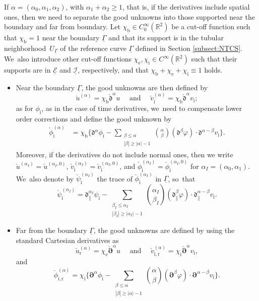 \documentclass[10pt]{amsart}
\newcommand{\R}{{\mathbb R}}
\newcommand{\cI}{{\mathcal I}}
\newcommand{\cE}{{\mathcal E}}
\newcommand{\ul}[1]{\underline{#1}}
\newcommand{\itGamma}{\mathit{\Gamma}}
\newcommand{\cpalpha}{\check{\bm{\partial}}^{\alpha} }
\newcommand{\cmfalpha}{\check{\mathfrak{d}}^{\alpha}}
\theoremstyle{definition}
\begin{document}
If $\alpha=(\alpha_0,\alpha_1,\alpha_2)$, with $\alpha_1+\alpha_2\geq 1$, that is, if the derivatives include spatial ones,
then we need to separate the good unknowns into those supported near the boundary and far from boundary.
Let $\chi_\mathrm{b}\in C_0^\infty(\R^2)$ be a cut-off function such that $\chi_\mathrm{b}=1$ near the boundary $\ul{\itGamma}$ and that its support is in the
tubular neighborhood~$U_{\ul{\itGamma}}$ of the reference curve $\ul{\itGamma}$ defined in Section \ref{subsect:NTCS}. We~also introduce other cut-off functions $\chi_\mathrm{e},\chi_\mathrm{i}\in C^\infty(\R^2)$ such that their supports are in $\ul{\cE}$ and $\ul{\cI}$, respectively,
and that $\chi_\mathrm{b}+\chi_\mathrm{e}+\chi_\mathrm{i}\equiv1$ holds.
\begin{itemize}
\item
Near the boundary $\ul{\itGamma}$, the good unknowns are then defined by
\[
\check{u}^{(\alpha)} = \chi_\mathrm{b} \cmfalpha u
\quad\mbox{ and }\quad
\check{v}_\mathrm{i}^{(\alpha)} = \chi_\mathrm{b} \cmfalpha v_\mathrm{i};
\]
as for $\phi_\mathrm{i}$, as in the case of time derivatives, we~need to compensate lower order corrections and define the good unknown by
\begin{align*}
\check{\phi}_\mathrm{i}^{(\alpha)}
&= \chi_\mathrm{b} \biggl\{ \mathfrak{d}^{\alpha}\phi_\mathrm{i} - \sum_{\substack{\beta\leq\alpha\\ |\beta|\geq|\alpha|-1}} \binom{\alpha}{\beta}
(\mathfrak{d}^{\beta}\varphi)\cdot \mathfrak{d}^{\alpha-\beta}v_\mathrm{i} \biggr\}.
\end{align*}
Moreover, if the derivatives do not include normal ones, then we write $\check{u}^{(\alpha_I)}=\check{u}^{(\alpha_I,0)}$,
$\check{v}_\mathrm{i}^{(\alpha_I)}=\check{v}_\mathrm{i}^{(\alpha_I,0)}$,
and $\check{\phi}_\mathrm{i}^{(\alpha_I)}=\check{\phi}_\mathrm{i}^{(\alpha_I,0)}$ for $\alpha_I=(\alpha_0,\alpha_1)$. We~also denote by $\check\psi_\mathrm{i}^{(\alpha_{I})}$ the trace of $\check{\phi}_\mathrm{i}^{(\alpha_I)}$ in $\ul{\itGamma}$, so~that
\[
\check\psi_\mathrm{i}^{(\alpha_{I})}=\mathfrak{d}_\parallel^{\alpha_{I}}\psi_\mathrm{i} - \sum_{\substack{\beta_I\leq\alpha_I\\ |\beta_I|\geq|\alpha_I|-1}} \binom{\alpha_I}{\beta_I}
(\mathfrak{d}_\parallel^{\beta}\varphi)\cdot \mathfrak{d}_\parallel^{\alpha-\beta}v_\mathrm{i}.
\]
\item
Far from the boundary $\ul{\itGamma}$, the good unknowns are defined by using the standard Cartesian derivatives as
\[
\check{u}_\mathrm{r}^{(\alpha)} = \chi_\mathrm{e} \cpalpha u
\quad\mbox{ and }\quad
\check{v}_\mathrm{i,r}^{(\alpha)} = \chi_\mathrm{i}\cpalpha v_\mathrm{i},
\]
and
\[
\check{\phi}_\mathrm{i,r}^{(\alpha)}
= \chi_\mathrm{i} \biggl\{ \bm{\partial}^\alpha\phi_\mathrm{i} - \sum_{\substack{\beta\leq\alpha\\ |\beta|\geq|\alpha|-1}} \binom{\alpha}{\beta}
(\bm{\partial}^{\beta}\varphi)\cdot\bm{\partial}^{\alpha-\beta}v_\mathrm{i} \biggr\}.
\]
\end{itemize}
\end{document}

